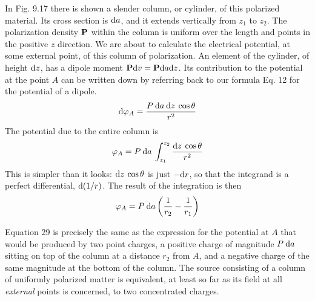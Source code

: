 In Fig. 9.17 there is shown a slender column, or cylinder, of this
polarized material. Its cross section is $\textup{d} a$, and it extends vertically
from $z_1$ to $z_2$. The polarization density $\mathbf{P}$ within the column is uniform
over the length and points in the positive $z$ direction. We are
about to calculate the electrical potential, at some external point, of
this column of polarization. An element of the cylinder, of height $\textup{d} z$,
has a dipole moment $\mathbf{P} \textup{d} v = \mathbf{P} \textup{d} a \textup{d} z$. Its contribution to the potential
at the point $A$ can be written down by referring back to our
formula Eq. 12 for the potential of a dipole.
\begin{equation}
  \textup{d}\varphi_A = \frac{P\:\textup{d} a\:\textup{d} z\:\cos\theta}{r^2}
\end{equation}
The potential due to the entire column is
\begin{equation}
  \varphi_A = P\:\textup{d} a\:\int_{z_1}^{z_2} \frac{\textup{d} z\:\cos\theta}{r^2}
\end{equation}
This is simpler than it looks: $\textup{d} z\:\cos\theta$ is just $-\textup{d} r$, so that the 
integrand is a perfect differential, $\textup{d}(1 /r)$. The result of the integration is
then
\begin{equation}
  \varphi_A = P\:\textup{d} a\left(\frac{1}{r_2}-\frac{1}{r_1}\right)
\end{equation}

Equation 29 is precisely the same as the expression for the potential
at $A$ that would be produced by two point charges, a positive
charge of magnitude $P\: \textup{d} a$ sitting on top of the column at a distance $r_2$
from $A$, and a negative charge of the same magnitude at the bottom
of the column. The source consisting of a column of uniformly
polarized matter is equivalent, at least so far as its field at all \emph{external}
points is concerned, to two concentrated charges.


